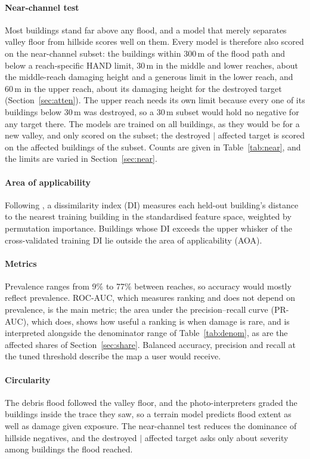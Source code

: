 \documentclass[journal,a4paper]{IEEEtran}
\begin{document}
\paragraph{Near-channel test} Most buildings stand far above any flood, and a model that merely separates valley floor from hillside scores well on them. Every model is therefore also scored on the near-channel subset: the buildings within 300\,m of the flood path and below a reach-specific HAND limit, 30\,m in the middle and lower reaches, about the middle-reach damaging height and a generous limit in the lower reach, and 60\,m in the upper reach, about its damaging height for the destroyed target (Section~\ref{sec:atten}). The upper reach needs its own limit because every one of its buildings below 30\,m was destroyed, so a 30\,m subset would hold no negative for any target there. The models are trained on all buildings, as they would be for a new valley, and only scored on the subset; the destroyed $\mid$ affected target is scored on the affected buildings of the subset. Counts are given in Table~\ref{tab:near}, and the limits are varied in Section~\ref{sec:near}.
\paragraph{Area of applicability} Following \citet{meyer2022}, a dissimilarity index (DI) measures each held-out building's distance to the nearest training building in the standardised feature space, weighted by permutation importance. Buildings whose DI exceeds the upper whisker of the cross-validated training DI lie outside the area of applicability (AOA).
\paragraph{Metrics} Prevalence ranges from 9\% to 77\% between reaches, so accuracy would mostly reflect prevalence. ROC-AUC, which measures ranking and does not depend on prevalence, is the main metric; the area under the precision--recall curve (PR-AUC), which does, shows how useful a ranking is when damage is rare, and is interpreted alongside the denominator range of Table~\ref{tab:denom}, as are the affected shares of Section~\ref{sec:share}. Balanced accuracy, precision and recall at the tuned threshold describe the map a user would receive.
\paragraph{Circularity} The debris flood followed the valley floor, and the photo-interpreters graded the buildings inside the trace they saw, so a terrain model predicts flood extent as well as damage given exposure. The near-channel test reduces the dominance of hillside negatives, and the destroyed $\mid$ affected target asks only about severity among buildings the flood reached.
\end{document}
